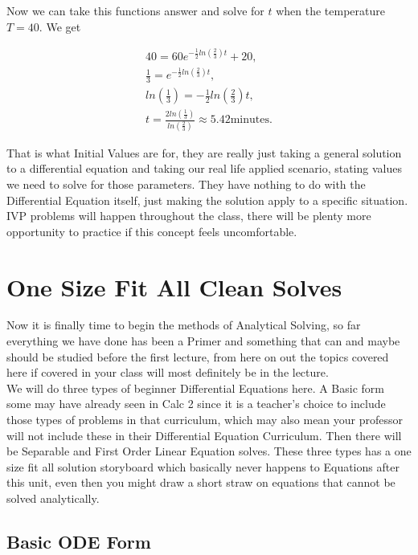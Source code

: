\documentclass[12pt]{article}
\begin{document}
Now we can take this functions answer and solve for $t$ when the temperature $T=40$. We get 

\begin{align*}
    40=60e^{-\frac{1}{2}ln(\frac{2}{3})t}+20, \\
    \frac{1}{3}=e^{-\frac{1}{2}ln(\frac{2}{3})t}, \\
    ln(\frac{1}{3})=-\frac{1}{2}ln(\frac{2}{3})t, \\
    t=\frac{2ln(\frac{1}{3})}{ln(\frac{2}{3})} \approx 5.42 \text{minutes}.
\end{align*}

That is what Initial Values are for, they are really just taking a general solution to a differential equation and taking our real life applied scenario, stating values we need to solve for those parameters. They have nothing to do with the Differential Equation itself, just making the solution apply to a specific situation. \\

IVP problems will happen throughout the class, there will be plenty more opportunity to practice if this concept feels uncomfortable.

\pagebreak

\section{One Size Fit All Clean Solves}

Now it is finally time to begin the methods of Analytical Solving, so far everything we have done has been a Primer and something that can and maybe should be studied before the first lecture, from here on out the topics covered here if covered in your class will most definitely be in the lecture. \\

We will do three types of beginner Differential Equations here. A Basic form some may have already seen in Calc 2 since it is a teacher's choice to include those types of problems in that curriculum, which may also mean your professor will not include these in their Differential Equation Curriculum. Then there will be Separable and First Order Linear Equation solves. These three types has a one size fit all solution storyboard which basically never happens to Equations after this unit, even then you might draw a short straw on equations that cannot be solved analytically.

\subsection{Basic ODE Form}
\end{document}

